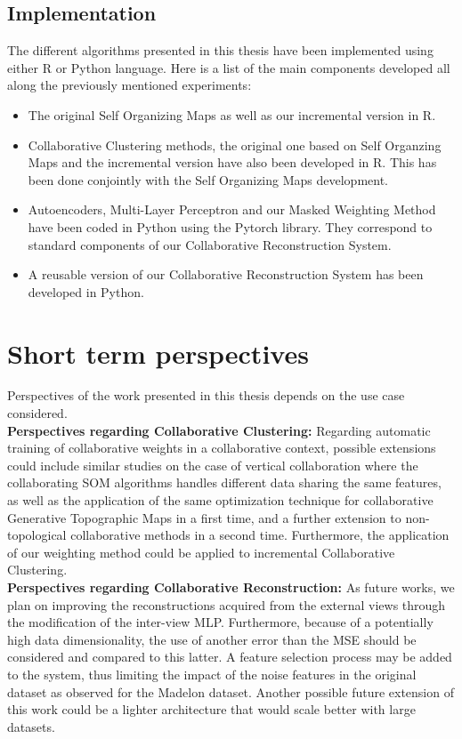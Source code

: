 \subsection{Implementation}
The different algorithms presented in this thesis have been implemented using either R or Python language. Here is a list of the main components developed all along the previously mentioned experiments:
\begin{itemize}
    \item The original Self Organizing Maps as well as our incremental version in R.
    \item Collaborative Clustering methods, the original one based on Self Organzing Maps and the incremental version have also been developed in R. This has been done conjointly with the Self Organizing Maps development.
    \item Autoencoders, Multi-Layer Perceptron and our Masked Weighting Method have been coded in Python using the Pytorch library. They correspond to standard components of our Collaborative Reconstruction System.
    \item A reusable version of our Collaborative Reconstruction System has been developed in Python.
\end{itemize}

\section{Short term perspectives}

Perspectives of the work presented in this thesis depends on the use case considered.\\

\textbf{Perspectives regarding Collaborative Clustering:} Regarding automatic training of collaborative weights in a collaborative context, possible extensions could include similar studies on the case of vertical collaboration where the collaborating SOM algorithms handles different data sharing the same features, as well as the application of the same optimization technique for collaborative Generative Topographic Maps in a first time, and a further extension to non-topological collaborative methods in a second time. Furthermore, the application of our weighting method could be applied to incremental Collaborative Clustering.\\

\textbf{Perspectives regarding Collaborative Reconstruction:} As future works, we plan on improving the reconstructions acquired from the external views through the modification of the inter-view MLP\@. Furthermore, because of a potentially high data dimensionality, the use of another error than the MSE should be considered and compared to this latter. A feature selection process may be added to the system, thus limiting the impact of the noise features in the original dataset as observed for the Madelon dataset. Another possible future extension of this work could be a lighter architecture that would scale better with large datasets. 

